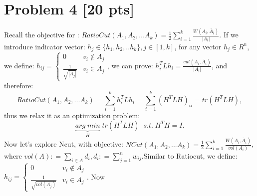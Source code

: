 \documentclass[11pt]{article}
\begin{document}
\section*{Problem 4 [20 pts]}
Recall the objective for : $RatioCut(A_1,A_2,...A_k) = \frac{1}{2}\sum\limits_{i=1}^{k}\frac{W(A_i, \overline{A}_i )}{|A_i|}$. If we introduce indicator vector: $h_j \in \{h_1, h_2,..h_k\}, j \in [1,k]$, for any vector $h_j\in R^n$, we define: $h_{ij}= \begin{cases} 0& { v_i \notin A_j}\\ \frac{1}{\sqrt{|A_j|}}& { v_i \in A_j} \end{cases}$, we can prove: $h_i^TLh_i =  \frac{cut(A_i, \overline{A}_i)}{|A_i|}$, and therefore:
\begin{equation}
	RatioCut(A_1,A_2,...A_k) = \sum\limits_{i=1}^{k}h_i^TLh_i = \sum\limits_{i=1}^{k}(H^TLH)_{ii} = tr(H^TLH),
\end{equation}
thus we relax it as an optimization problem:
\begin{equation}
	\underbrace{arg\;min}_H\; tr(H^TLH) \;\; s.t.\;H^TH=I.
\end{equation}
Now let's explore Ncut, with objective:
$NCut(A_1,A_2,...A_k) = \frac{1}{2}\sum\limits_{i=1}^{k}\frac{W(A_i, \overline{A}_i )}{vol(A_i)}$, where $vol(A): = \sum\limits_{i \in A}d_i, d_i: = \sum\limits_{j=1}^{n}w_{ij}$.Similar to Ratiocut, we define: $h_{ij}= \begin{cases} 0& { v_i \notin A_j}\\ \frac{1}{\sqrt{vol(A_j)}}& { v_i \in A_j} \end{cases}$. Now
\end{document}
